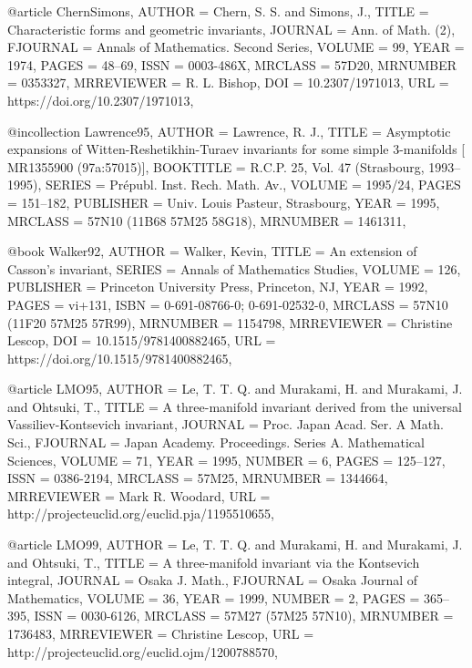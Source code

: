 @article {ChernSimons,
    AUTHOR = {Chern, S. S. and Simons, J.},
     TITLE = {Characteristic forms and geometric invariants},
   JOURNAL = {Ann. of Math. (2)},
  FJOURNAL = {Annals of Mathematics. Second Series},
    VOLUME = {99},
      YEAR = {1974},
     PAGES = {48--69},
      ISSN = {0003-486X},
   MRCLASS = {57D20},
  MRNUMBER = {0353327},
MRREVIEWER = {R. L. Bishop},
       DOI = {10.2307/1971013},
       URL = {https://doi.org/10.2307/1971013},
}

@incollection {Lawrence95,
    AUTHOR = {Lawrence, R. J.},
     TITLE = {Asymptotic expansions of {W}itten-{R}eshetikhin-{T}uraev
              invariants for some simple {$3$}-manifolds [ {MR}1355900
              (97a:57015)]},
 BOOKTITLE = {R.{C}.{P}. 25, {V}ol. 47 ({S}trasbourg, 1993--1995)},
    SERIES = {Pr\'{e}publ. Inst. Rech. Math. Av.},
    VOLUME = {1995/24},
     PAGES = {151--182},
 PUBLISHER = {Univ. Louis Pasteur, Strasbourg},
      YEAR = {1995},
   MRCLASS = {57N10 (11B68 57M25 58G18)},
  MRNUMBER = {1461311},
}

@book {Walker92,
    AUTHOR = {Walker, Kevin},
     TITLE = {An extension of {C}asson's invariant},
    SERIES = {Annals of Mathematics Studies},
    VOLUME = {126},
 PUBLISHER = {Princeton University Press, Princeton, NJ},
      YEAR = {1992},
     PAGES = {vi+131},
      ISBN = {0-691-08766-0; 0-691-02532-0},
   MRCLASS = {57N10 (11F20 57M25 57R99)},
  MRNUMBER = {1154798},
MRREVIEWER = {Christine Lescop},
       DOI = {10.1515/9781400882465},
       URL = {https://doi.org/10.1515/9781400882465},
}

@article {LMO95,
    AUTHOR = {Le, T. T. Q. and Murakami, H. and Murakami, J. and
              Ohtsuki, T.},
     TITLE = {A three-manifold invariant derived from the universal
              {V}assiliev-{K}ontsevich invariant},
   JOURNAL = {Proc. Japan Acad. Ser. A Math. Sci.},
  FJOURNAL = {Japan Academy. Proceedings. Series A. Mathematical Sciences},
    VOLUME = {71},
      YEAR = {1995},
    NUMBER = {6},
     PAGES = {125--127},
      ISSN = {0386-2194},
   MRCLASS = {57M25},
  MRNUMBER = {1344664},
MRREVIEWER = {Mark R. Woodard},
       URL = {http://projecteuclid.org/euclid.pja/1195510655},
}

@article {LMO99,
    AUTHOR = {Le, T. T. Q. and Murakami, H. and Murakami, J. and
              Ohtsuki, T.},
     TITLE = {A three-manifold invariant via the {K}ontsevich integral},
   JOURNAL = {Osaka J. Math.},
  FJOURNAL = {Osaka Journal of Mathematics},
    VOLUME = {36},
      YEAR = {1999},
    NUMBER = {2},
     PAGES = {365--395},
      ISSN = {0030-6126},
   MRCLASS = {57M27 (57M25 57N10)},
  MRNUMBER = {1736483},
MRREVIEWER = {Christine Lescop},
       URL = {http://projecteuclid.org/euclid.ojm/1200788570},
}

